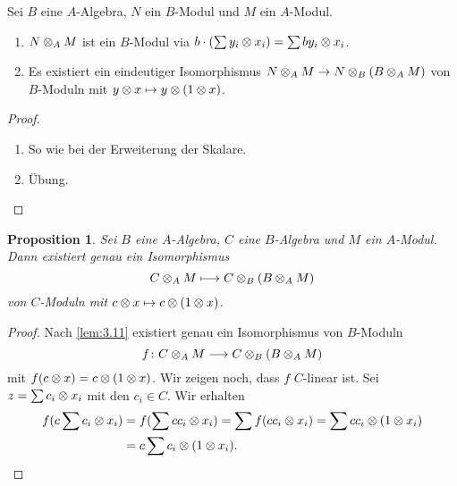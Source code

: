 \documentclass[12pt,a4paper]{scrartcl}
\theoremstyle{cplain}
\newtheorem{prop}[thmcounter]{Proposition}
\theoremstyle{cdef}
\begin{document}
\begin{lem} \label{lem:3.11}
	Sei $B$ eine $A$-Algebra, $N$ ein $B$-Modul und $M$ ein $A$-Modul.
	\begin{enumerate}
		\item $N\otimes_AM$ ist ein $B$-Modul via $b\cdot(\sum y_i\otimes x_i) = \sum by_i\otimes x_i$. \label{lem:311:i}
		\item Es existiert ein eindeutiger Isomorphismus $N\otimes_AM\to N\otimes_B(B\otimes_AM)$ von $B$-Moduln mit $y\otimes x\mapsto y\otimes (1\otimes x)$. \label{lem:311:ii}
	\end{enumerate}
\end{lem}
\begin{proof}
	\leavevmode
	\begin{enumerate}[label=\ref{lem:311:\roman*}]
		\item So wie bei der Erweiterung der Skalare.
		\item Übung. \qedhere
	\end{enumerate}
\end{proof}

\begin{prop} \label{prop:3.12}
	Sei $B$ eine $A$-Algebra, $C$ eine $B$-Algebra und $M$ ein $A$-Modul. Dann existiert genau ein Isomorphismus
	$$C\otimes_A M  \longmapsto  C\otimes_B(B\otimes_AM)$$
	von $C$-Moduln mit $c\otimes x\mapsto c\otimes(1\otimes x)$.
\end{prop}
\begin{proof}
	Nach \cref{lem:3.11} existiert genau ein Isomorphismus von $B$-Moduln
	\[ f\colon C\otimes_AM\longrightarrow C\otimes_B(B\otimes_AM)\]
	mit $f(c\otimes x) = c\otimes(1\otimes x)$. Wir zeigen noch, dass $f$ $C$-linear ist. Sei $z = \sum c_i\otimes x_i$ mit den $c_i\in C$. Wir erhalten
	\begin{align*}
		f(c\sum c_i\otimes x_i) &= f(\sum cc_i\otimes x_i ) = \sum f(cc_i\otimes x_i) = \sum cc_i\otimes(1\otimes x_i) \\
		&= c\sum c_i\otimes(1\otimes x_i). \qedhere
	\end{align*}
\end{proof}
\end{document}
